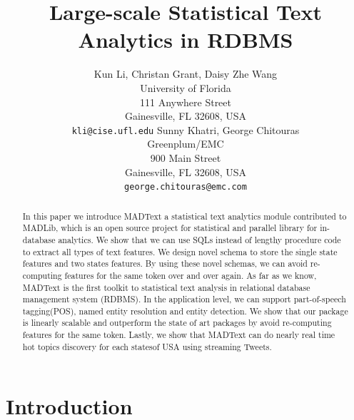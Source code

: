 \documentclass[11pt,letterpaper]{article}
\title{Large-scale Statistical Text Analytics in RDBMS\Thanks{This
    submitting for double-blind reviewing.}}
\author{Kun Li, Christan Grant, Daisy Zhe Wang\\
	    University of Florida\\
	    111 Anywhere Street\\
	    Gainesville, FL 32608, USA\\
	    {\tt kli@cise.ufl.edu}
	  \And
	Sunny Khatri, George Chitouras\\
  	Greenplum/EMC\\
  	900 Main Street\\
	    Gainesville, FL 32608, USA\\
  {\tt george.chitouras@emc.com}}
\date{}
\begin{document}
\maketitle
\begin{abstract}
In this paper we introduce MADText a statistical text analytics module contributed to MADLib, 
which is an open source project for statistical and parallel library for in-database analytics.  
We show that we can use SQLs instead of lengthy procedure code to extract all types of text features.  
We design novel schema to store the single state features and two states features.   
By using these novel schemas, we can avoid re-computing features for the same token over and over again.  
As far as we know, MADText is the first toolkit to statistical text analysis in relational database management system (RDBMS).  
In the application level, we can support part-of-speech tagging(POS), named entity resolution and entity detection.  
We show that our package is linearly scalable and outperform the state of art packages by avoid re-computing features for the same token. 
Lastly, we show that MADText can do nearly real time hot topics discovery for each statesof USA using streaming Tweets.
\end{abstract}

\section{Introduction}
\end{document}
